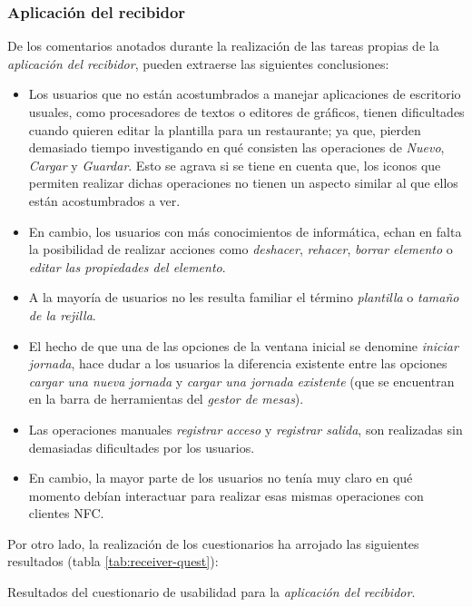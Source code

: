 \subsubsection{Aplicación del recibidor}
De los comentarios anotados durante la realización de las tareas propias
de la \emph{aplicación del recibidor}, pueden extraerse las siguientes 
conclusiones:
\begin{itemize}
\item Los usuarios que no están acostumbrados a manejar aplicaciones de
escritorio usuales, como procesadores de textos o editores de gráficos, tienen
dificultades cuando quieren editar la plantilla para un restaurante; ya que,
pierden demasiado tiempo investigando en qué consisten las operaciones de
\emph{Nuevo}, \emph{Cargar} y \emph{Guardar}. Esto se agrava si se tiene en
cuenta que, los iconos que permiten realizar dichas operaciones no tienen un
aspecto similar al que ellos están acostumbrados a ver.
\item En cambio, los usuarios con más conocimientos de informática, echan
en falta la posibilidad de realizar acciones como \emph{deshacer},
\emph{rehacer}, \emph{borrar elemento} o \emph{editar las propiedades del
elemento}.
\item A la mayoría de usuarios no les resulta familiar el término
\emph{plantilla} o \emph{tamaño de la rejilla}.
\item El hecho de que una de las opciones de la ventana inicial se denomine
\emph{iniciar jornada}, hace dudar a los usuarios la diferencia existente entre
las opciones \emph{cargar una nueva jornada} y \emph{cargar una jornada
existente} (que se encuentran en la barra de herramientas del \emph{gestor de
mesas}).
\item Las operaciones manuales \emph{registrar acceso} y \emph{registrar
salida}, son realizadas sin demasiadas dificultades por los usuarios.
\item En cambio, la mayor parte de los usuarios no tenía muy claro en qué
momento debían interactuar para realizar esas mismas operaciones con clientes
\acs{NFC}.
\end{itemize}

Por otro lado, la realización de los cuestionarios ha arrojado las siguientes
resultados (tabla \ref{tab:receiver-quest}):

\begin{table}[H]
  \centering
  \label{tab:receiver-quest}
  {\normalsize
  
  }  
  \caption[Resultados del cuestionario de usabilidad para la \emph{aplicación
  del recibidor}.]{Resultados del cuestionario de usabilidad para la
  \emph{aplicación del recibidor}.}
\end{table}


